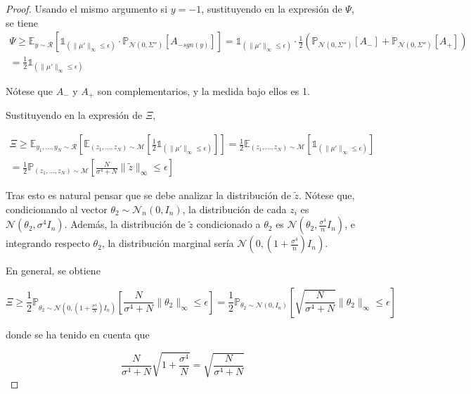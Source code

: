 \begin{proof}
Usando el mismo argumento si $y=-1$, sustituyendo en la expresión de $\Psi$, se tiene
\begin{multline}
\Psi \geq \mathbb{E}_{y \sim \mathcal{R}} \left[ \mathbb{1}_{(\|\mu' \|_{\infty} \leq \epsilon)} \cdot \mathbb{P}_{\mathcal{N}(0,\Sigma'')} [A_{-sgn(y)}] \right] = \mathbb{1}_{(\|\mu' \|_{\infty} \leq \epsilon)} \cdot \frac{1}{2} \left( \mathbb{P}_{\mathcal{N}(0,\Sigma'')}[A_{-}] + \mathbb{P}_{\mathcal{N}(0,\Sigma'')}[A_{+}] \right) \\
= \frac{1}{2} \mathbb{1}_{(\|\mu' \|_{\infty} \leq \epsilon)}
\end{multline}

Nótese que $A_{-}$ y $A_{+}$ son complementarios, y la medida bajo ellos es 1.

Sustituyendo en la expresión de $\Xi$,

\begin{multline}
\Xi \geq \mathbb{E}_{y_1,\ldots,y_N \sim \mathcal{R}} \left[ \mathbb{E}_{(z_1,\ldots,z_N) \sim \mathcal{M}} \left[ \frac{1}{2} \mathbb{1}_{(\|\mu' \|_{\infty} \leq \epsilon)} \right] \right] = \frac{1}{2} \mathbb{E}_{(z_1,\ldots,z_N) \sim \mathcal{M}} [\mathbb{1}_{(\|\mu' \|_{\infty} \leq \epsilon)}] \\
= \frac{1}{2} \mathbb{P}_{(z_1,\ldots,z_N) \sim \mathcal{M}} \left[ \frac{N}{\sigma^4 + N} \|\tilde{z} \|_{\infty} \leq \epsilon \right]
\end{multline}

Tras esto es natural pensar que se debe analizar la distribución de $\tilde{z}$. Nótese que, condicionando al vector $\theta_2 \sim \mathcal{N}_n (0,I_n)$, la distribución de cada $z_i$ es $\mathcal{N}(\theta_2,\sigma^4 I_n)$. Además, la distribución de $\tilde{z}$ condicionado a $\theta_2$ es $\mathcal{N}(\theta_2,\frac{\sigma^4}{n} I_n)$, e integrando respecto $\theta_2$, la distribución marginal sería $\mathcal{N}(0,(1+\frac{\sigma^4}{n})I_n)$.

En general, se obtiene

$$\Xi \geq \frac{1}{2} \mathbb{P}_{\theta_2 \sim \mathcal{N}(0,(1+\frac{\sigma^4}{N})I_n)} \left[ \frac{N}{\sigma^4 + N} \|\theta_2 \|_{\infty} \leq \epsilon \right] = \frac{1}{2} \mathbb{P}_{\theta_2 \sim \mathcal{N}(0,I_n)} \left[ \sqrt{\frac{N}{\sigma^4 + N}} \|\theta_2 \|_{\infty} \leq \epsilon \right]$$

donde se ha tenido en cuenta que

$$\frac{N}{\sigma^4 + N} \sqrt{1 + \frac{\sigma^4}{N}} = \sqrt{\frac{N}{\sigma^4 + N}}$$

\end{proof}

